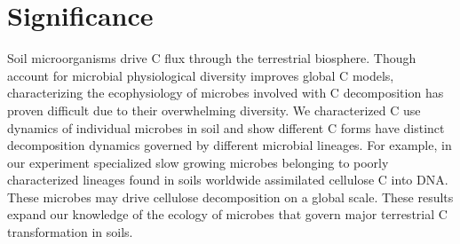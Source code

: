 \section{Significance} Soil microorganisms drive C flux through the terrestrial
biosphere. Though account for microbial physiological diversity improves global
C models, characterizing the ecophysiology of microbes involved with
C decomposition has proven difficult due to their overwhelming diversity. We
characterized C use dynamics of individual microbes in soil and show 
different C forms have distinct decomposition dynamics governed by different
microbial lineages. For example, in our experiment specialized slow growing
microbes belonging to poorly characterized lineages found in soils worldwide
assimilated cellulose C into DNA. These microbes may drive cellulose
decomposition on a global scale. These results expand our knowledge of the
ecology of microbes that govern major terrestrial C transformation in soils.
